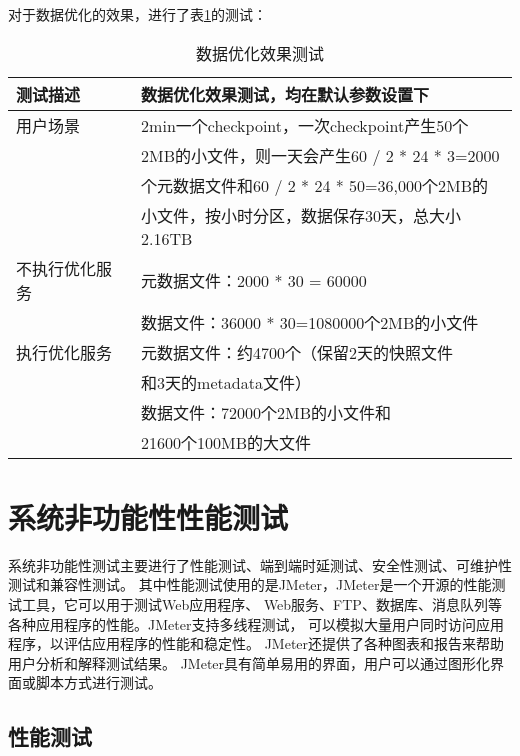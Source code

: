 对于数据优化的效果，进行了表\ref{tab:exampletable15}的测试：

\begin{table}[H]
  \centering
  \caption{数据优化效果测试}
  \label{tab:exampletable15}
  \begin{tabular}{ll}
    \toprule
    测试描述         & 数据优化效果测试，均在默认参数设置下         \\
    \midrule
    用户场景         & 2min一个checkpoint，一次checkpoint产生50个   \\
                   & 2MB的小文件，则一天会产生60 / 2 * 24 * 3=2000   \\
                   & 个元数据文件和60 / 2 * 24 * 50=36,000个2MB的     \\
                   & 小文件，按小时分区，数据保存30天，总大小2.16TB              \\
    不执行优化服务         & 元数据文件：2000 * 30 = 60000         \\
                        & 数据文件：36000 * 30=1080000个2MB的小文件         \\
    执行优化服务       & 元数据文件：约4700个（保留2天的快照文件 \\
                     & \hspace{2.2cm}和3天的metadata文件）        \\
                     & 数据文件：72000个2MB的小文件和 \\
                     & \hspace{1.85cm}21600个100MB的大文件        \\
    \bottomrule
  \end{tabular}
\end{table}

\section{系统非功能性性能测试}

系统非功能性测试主要进行了性能测试、端到端时延测试、安全性测试、可维护性测试和兼容性测试。
其中性能测试使用的是JMeter，JMeter是一个开源的性能测试工具，它可以用于测试Web应用程序、
Web服务、FTP、数据库、消息队列等各种应用程序的性能。JMeter支持多线程测试，
可以模拟大量用户同时访问应用程序，以评估应用程序的性能和稳定性。
JMeter还提供了各种图表和报告来帮助用户分析和解释测试结果。
JMeter具有简单易用的界面，用户可以通过图形化界面或脚本方式进行测试。

\subsection{性能测试}

